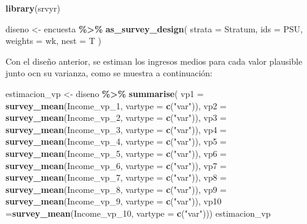 \documentclass[
  12pt,
]{book}
\newenvironment{Shaded}{\begin{snugshade}}{\end{snugshade}}
\newcommand{\AttributeTok}[1]{\textcolor[rgb]{0.13,0.29,0.53}{#1}}
\newcommand{\FunctionTok}[1]{\textcolor[rgb]{0.13,0.29,0.53}{\textbf{#1}}}
\newcommand{\NormalTok}[1]{#1}
\newcommand{\OtherTok}[1]{\textcolor[rgb]{0.56,0.35,0.01}{#1}}
\newcommand{\SpecialCharTok}[1]{\textcolor[rgb]{0.81,0.36,0.00}{\textbf{#1}}}
\newcommand{\StringTok}[1]{\textcolor[rgb]{0.31,0.60,0.02}{#1}}
\begin{document}
\begin{Shaded}
\begin{Highlighting}[]
\FunctionTok{library}\NormalTok{(srvyr)}

\NormalTok{diseno }\OtherTok{\textless{}{-}}\NormalTok{ encuesta }\SpecialCharTok{\%\textgreater{}\%}
  \FunctionTok{as\_survey\_design}\NormalTok{(}
    \AttributeTok{strata =}\NormalTok{ Stratum,}
    \AttributeTok{ids =}\NormalTok{ PSU,}
    \AttributeTok{weights =}\NormalTok{ wk,}
    \AttributeTok{nest =}\NormalTok{ T}
\NormalTok{  )}
\end{Highlighting}
\end{Shaded}

Con el diseño anterior, se estiman los ingresos medios para cada valor plausible junto ocn su varianza, como se muestra a continuación:

\begin{Shaded}
\begin{Highlighting}[]
\NormalTok{estimacion\_vp }\OtherTok{\textless{}{-}}\NormalTok{  diseno }\SpecialCharTok{\%\textgreater{}\%} 
 \FunctionTok{summarise}\NormalTok{(}
   \AttributeTok{vp1 =} \FunctionTok{survey\_mean}\NormalTok{(Income\_vp\_1, }\AttributeTok{vartype =} \FunctionTok{c}\NormalTok{(}\StringTok{"var"}\NormalTok{)),}
   \AttributeTok{vp2 =} \FunctionTok{survey\_mean}\NormalTok{(Income\_vp\_2, }\AttributeTok{vartype =} \FunctionTok{c}\NormalTok{(}\StringTok{"var"}\NormalTok{)),}
   \AttributeTok{vp3 =} \FunctionTok{survey\_mean}\NormalTok{(Income\_vp\_3, }\AttributeTok{vartype =} \FunctionTok{c}\NormalTok{(}\StringTok{"var"}\NormalTok{)),}
   \AttributeTok{vp4 =} \FunctionTok{survey\_mean}\NormalTok{(Income\_vp\_4, }\AttributeTok{vartype =} \FunctionTok{c}\NormalTok{(}\StringTok{"var"}\NormalTok{)),}
   \AttributeTok{vp5 =} \FunctionTok{survey\_mean}\NormalTok{(Income\_vp\_5, }\AttributeTok{vartype =} \FunctionTok{c}\NormalTok{(}\StringTok{"var"}\NormalTok{)),}
   \AttributeTok{vp6 =} \FunctionTok{survey\_mean}\NormalTok{(Income\_vp\_6, }\AttributeTok{vartype =} \FunctionTok{c}\NormalTok{(}\StringTok{"var"}\NormalTok{)),}
   \AttributeTok{vp7 =} \FunctionTok{survey\_mean}\NormalTok{(Income\_vp\_7, }\AttributeTok{vartype =} \FunctionTok{c}\NormalTok{(}\StringTok{"var"}\NormalTok{)),}
   \AttributeTok{vp8 =} \FunctionTok{survey\_mean}\NormalTok{(Income\_vp\_8, }\AttributeTok{vartype =} \FunctionTok{c}\NormalTok{(}\StringTok{"var"}\NormalTok{)),}
   \AttributeTok{vp9 =} \FunctionTok{survey\_mean}\NormalTok{(Income\_vp\_9, }\AttributeTok{vartype =} \FunctionTok{c}\NormalTok{(}\StringTok{"var"}\NormalTok{)),}
   \AttributeTok{vp10 =}\FunctionTok{survey\_mean}\NormalTok{(Income\_vp\_10, }\AttributeTok{vartype =} \FunctionTok{c}\NormalTok{(}\StringTok{"var"}\NormalTok{)))}
\NormalTok{estimacion\_vp}
\end{Highlighting}
\end{Shaded}
\end{document}
